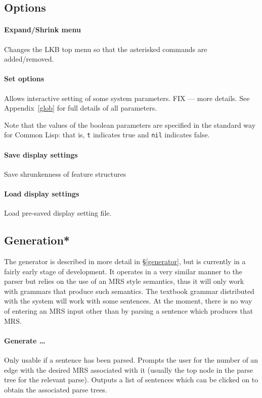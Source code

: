 \documentclass[12pt]{report}
\begin{document}
\subsection{Options}
\label{display}

\paragraph{Expand/Shrink menu} Changes the LKB top menu so that the
asterisked commands are added/removed.

\paragraph{Set options} Allows interactive setting of some system
parameters.  
FIX --- more details.
See Appendix~\ref{glob} for full details of all parameters.

Note that the values of the boolean parameters are specified 
in the standard way for Common Lisp: that is, {\tt t} indicates
true and {\tt nil} indicates false.

\paragraph{Save display settings} Save shrunkenness of feature structures

\paragraph{Load display settings} Load pre-saved display setting file.

\subsection{Generation*}
\label{gencommands}

The generator is described in more detail in \S\ref{generator},
but is currently in a fairly early stage of development.
It operates in a very similar manner to the parser
but relies on the use of an MRS style semantics,
thus it will only work with grammars that produce 
such semantics.  
The textbook grammar distributed with
the system will work with some sentences.
At the moment,
there is no way of entering an MRS input other than by parsing
a sentence which produces that MRS.

\paragraph{Generate \ldots}
Only usable if a sentence has been parsed.  Prompts the user for
the number of an edge with the desired MRS associated with it
(usually the top node in the parse tree for the relevant parse).
Outputs a list of sentences which can be clicked on to
obtain the associated parse trees.
\end{document}
